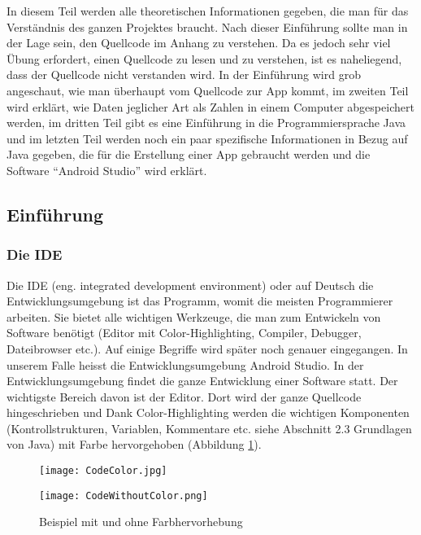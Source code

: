 
In diesem Teil werden alle theoretischen Informationen gegeben, die man für das Verständnis des ganzen Projektes braucht. Nach dieser Einführung sollte man in der Lage sein, den Quellcode im Anhang zu verstehen. Da es jedoch sehr viel Übung erfordert, einen Quellcode zu lesen und zu verstehen, ist es naheliegend, dass der Quellcode nicht verstanden wird. In der Einführung wird grob angeschaut, wie man überhaupt vom Quellcode zur App kommt, im zweiten Teil wird erklärt, wie Daten jeglicher Art als Zahlen in einem Computer abgespeichert werden, im dritten Teil gibt es eine Einführung in die Programmiersprache Java und im letzten Teil werden noch ein paar spezifische Informationen in Bezug auf Java gegeben, die für die Erstellung einer App gebraucht werden und die Software "`Android Studio"' wird erklärt.









\subsection{Einführung}


\subsubsection{Die IDE}


Die IDE (eng. integrated development environment) oder auf Deutsch die Entwicklungsumgebung ist das Programm, womit die meisten Programmierer arbeiten. Sie bietet alle wichtigen Werkzeuge, die man zum Entwickeln von Software benötigt (Editor mit Color-Highlighting, Compiler, Debugger, Dateibrowser etc.). Auf einige Begriffe wird später noch genauer eingegangen. In unserem Falle heisst die Entwicklungsumgebung Android Studio. In der Entwicklungsumgebung findet die ganze Entwicklung einer Software statt. Der wichtigste Bereich davon ist der Editor. Dort wird der ganze Quellcode hingeschrieben und Dank Color-Highlighting werden die wichtigen Komponenten (Kontrollstrukturen, Variablen, Kommentare etc. siehe Abschnitt 2.3 Grundlagen von Java) mit Farbe hervorgehoben (Abbildung \ref{fig:Colorhighlighting}).


\begin{figure}[htbp]


 \centering


    \texttt{[image: CodeColor.jpg]}


    \texttt{[image: CodeWithoutColor.png]}


 \caption{Beispiel mit und ohne Farbhervorhebung \cite{Colorhighlighting}}


 \label{fig:Colorhighlighting}


\end{figure}


